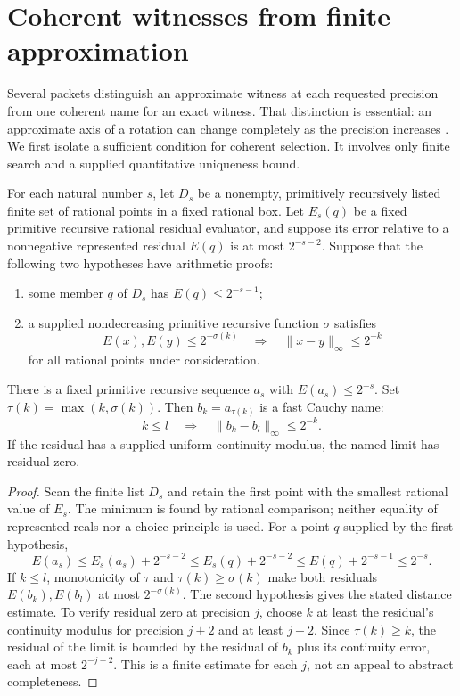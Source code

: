 \section{Coherent witnesses from finite approximation}
\label{ana:coherent}

Several packets distinguish an approximate witness at each requested precision
from one coherent name for an exact witness.  That distinction is essential:
an approximate axis of a rotation can change completely as the precision
increases \cite{repoRotation}.  We first isolate a sufficient condition for coherent selection.
It involves only finite search and a supplied quantitative uniqueness bound.

\begin{theorem}
\label{ana:selection}
For each natural number $s$, let $D_s$ be a nonempty, primitively recursively
listed finite set of rational points in a fixed rational box.  Let $E_s(q)$
be a fixed primitive recursive rational residual evaluator, and suppose
its error relative to a
nonnegative represented residual $E(q)$ is at most $2^{-s-2}$.
Suppose that the following two hypotheses have arithmetic proofs:
\begin{enumerate}
\item some member $q$ of $D_s$ has $E(q)\le 2^{-s-1}$;
\item a supplied nondecreasing primitive recursive function $\sigma$ satisfies
\[
 E(x),E(y)\le 2^{-\sigma(k)}
 \quad\Longrightarrow\quad
 \lVert x-y\rVert_\infty\le 2^{-k}
\]
for all rational points under consideration.
\end{enumerate}
There is a fixed primitive recursive sequence $a_s$ with
$E(a_s)\le 2^{-s}$.  Set $\tau(k)=\max(k,\sigma(k))$.
Then $b_k=a_{\tau(k)}$ is a fast Cauchy name:
\[
 k\le l\quad\Longrightarrow\quad
 \lVert b_k-b_l\rVert_\infty\le 2^{-k}.
\]
If the residual has a supplied uniform continuity modulus, the named limit
has residual zero.
\end{theorem}

\begin{proof}
Scan the finite list $D_s$ and retain the first point with the smallest
rational value of $E_s$.  The minimum is found by rational comparison;
neither equality of represented reals nor a choice principle is used.
For a point $q$ supplied by the first hypothesis,
\[
 E(a_s)\le E_s(a_s)+2^{-s-2}
 \le E_s(q)+2^{-s-2}
 \le E(q)+2^{-s-1}\le 2^{-s}.
\]
If $k\le l$, monotonicity of $\tau$ and $\tau(k)\ge\sigma(k)$ make both residuals
$E(b_k),E(b_l)$ at most $2^{-\sigma(k)}$.  The second hypothesis gives the
stated distance estimate.  To verify residual zero at precision $j$, choose
$k$ at least the residual's continuity modulus for precision $j+2$ and
at least $j+2$.  Since $\tau(k)\ge k$, the residual of the limit is bounded
by the residual of $b_k$ plus its continuity error, each at most
$2^{-j-2}$.  This is a finite estimate for each $j$, not an appeal to
abstract completeness.
\end{proof}

